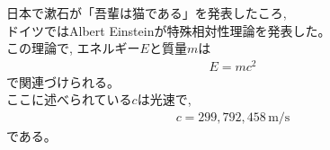 \documentclass[fleqn,autodetect-engine,dvipdfmxi-if-dvi,ja=standard]{bxjsarticle}
\begin{document}
日本で漱石が「吾輩は猫である」を発表したころ,\\
ドイツではAlbert Einsteinが特殊相対性理論を発表した。\\

この理論で, エネルギー$E$と質量$m$は
\begin{eqnarray}
  E = mc^{2} \nonumber
\end{eqnarray}
で関連づけられる。\\
ここに述べられている$c$は光速で,
\begin{eqnarray}
 c = 299{,}792{,}458\,\mathrm{m/s} \nonumber
\end{eqnarray}
である。
\end{document}

